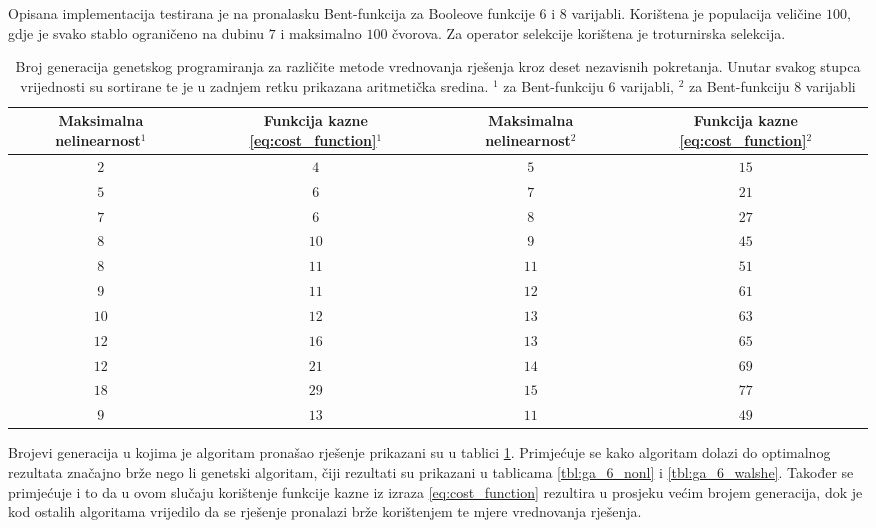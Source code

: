 Opisana implementacija testirana je na pronalasku Bent-funkcija za Booleove funkcije $6$ i $8$ varijabli.
Korištena je populacija veličine $100$, gdje je svako stablo ograničeno na dubinu $7$ i maksimalno $100$ čvorova.
Za operator selekcije korištena je troturnirska selekcija.
\begin{table}[]
    \centering
    \captionsetup{justification=centering}
    \caption{Broj generacija genetskog programiranja za različite metode vrednovanja rješenja kroz deset nezavisnih pokretanja. Unutar svakog stupca vrijednosti su sortirane te je u zadnjem retku prikazana aritmetička sredina. \newline
    \footnotesize{$^1$ za Bent-funkciju $6$ varijabli, $^2$ za Bent-funkciju $8$ varijabli}}
    \begin{tabular}{cccc} \hline
        \makecell{Maksimalna \\ nelinearnost$^1$} & \makecell{Funkcija \\ kazne \eqref{eq:cost_function}$^1$} & \makecell{Maksimalna \\ nelinearnost$^2$} & \makecell{Funkcija \\ kazne \eqref{eq:cost_function}$^2$} \\ \hline
         $2$ &  $4$ &  $5$ & $15$ \\
         $5$ &  $6$ &  $7$ & $21$ \\
         $7$ &  $6$ &  $8$ & $27$ \\
         $8$ & $10$ &  $9$ & $45$ \\
         $8$ & $11$ & $11$ & $51$ \\
         $9$ & $11$ & $12$ & $61$ \\
        $10$ & $12$ & $13$ & $63$ \\
        $12$ & $16$ & $13$ & $65$ \\
        $12$ & $21$ & $14$ & $69$ \\
        $18$ & $29$ & $15$ & $77$ \\ \hline
         $9$ & $13$ & $11$ & $49$
    \end{tabular}
    \label{tbl:gp_6_8}
\end{table}
Brojevi generacija u kojima je algoritam pronašao rješenje prikazani su u tablici \ref{tbl:gp_6_8}.
Primjećuje se kako algoritam dolazi do optimalnog rezultata značajno brže nego li genetski algoritam, čiji rezultati su prikazani u tablicama \ref{tbl:ga_6_nonl} i \ref{tbl:ga_6_walshe}.
Također se primjećuje i to da u ovom slučaju korištenje funkcije kazne iz izraza \eqref{eq:cost_function} rezultira u prosjeku većim brojem generacija, dok je kod ostalih algoritama vrijedilo da se rješenje pronalazi brže korištenjem te mjere vrednovanja rješenja.

